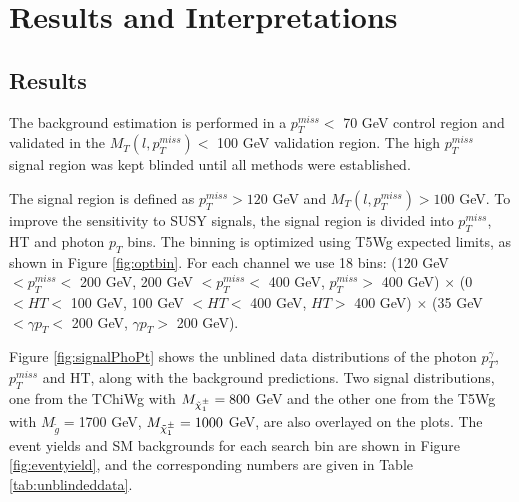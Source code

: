 \documentclass[thesis.tex]{subfiles}
\renewcommand\_{\textunderscore\allowbreak}
\begin{document}
\chapter{Results and Interpretations}
\label{ch7}

\section{Results}
The background estimation is performed in a $p_T^{miss} < $ 70 GeV control region and validated in the $M_T(l, p_T^{miss}) < $ 100 GeV validation region. The high $p_T^{miss}$ signal region was kept blinded until all methods were established.

The signal region is defined as $p_T^{miss} > 120$ GeV and $M_T(l, p_T^{miss}) > 100$ GeV. To improve the sensitivity to SUSY signals, the signal region is divided into $p_T^{miss}$, HT and photon $p_T$ bins. The binning is optimized using T5Wg expected limits, as shown in Figure \ref{fig:optbin}. For each channel we use 18 bins: (120 GeV $< p_T^{miss} <$ 200 GeV, 200 GeV $< p_T^{miss} <$ 400 GeV, $ p_T^{miss} >$ 400 GeV) $\times$ (0 $< HT <$ 100 GeV, 100 GeV $< HT <$ 400 GeV, $HT >$ 400 GeV) $\times$ (35 GeV $< \gamma p_T < $ 200 GeV, $\gamma p_T > $ 200 GeV).

Figure \ref{fig:signalPhoPt} shows the unblined data distributions of the photon $p_T^{\gamma}$, $p_T^{miss}$ and HT, along with the background predictions. Two signal distributions, one from the TChiWg with $M_{\tilde{\chi}_1^\pm} = 800$ GeV and the other one from the T5Wg with $M_{\tilde{g}} = $1700 GeV, $M_{\tilde{\chi}_1^\pm} = 1000$ GeV, are also overlayed on the plots. The event yields and SM backgrounds for each search bin are shown in Figure \ref{fig:eventyield}, and the corresponding numbers are given in Table \ref{tab:unblindeddata}. 
\end{document}
